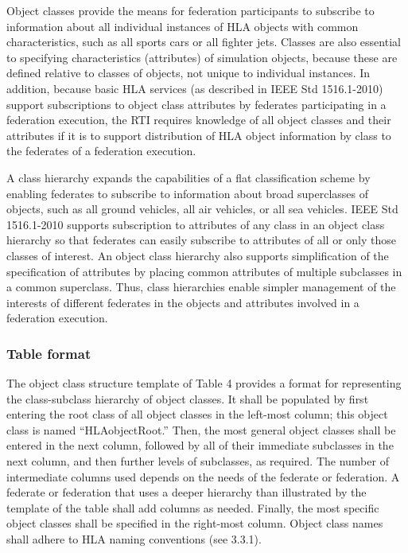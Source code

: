 
\newpage
Object classes provide the means for federation participants to subscribe to information about all individual instances of HLA objects with common characteristics, such as all sports cars or all fighter jets. Classes are also essential to specifying characteristics (attributes) of simulation objects, because these are defined relative to classes of objects, not unique to individual instances. In addition, because basic HLA services (as described in IEEE Std 1516.1-2010) support subscriptions to object class attributes by federates participating in a federation execution, the RTI requires knowledge of all object classes and their attributes if it is to support distribution of HLA object information by class to the federates of a federation execution.

A class hierarchy expands the capabilities of a flat classification scheme by enabling federates to subscribe to information about broad superclasses of objects, such as all ground vehicles, all air vehicles, or all sea vehicles. IEEE Std 1516.1-2010 supports subscription to attributes of any class in an object class hierarchy so that federates can easily subscribe to attributes of all or only those classes of interest. An object class hierarchy also supports simplification of the specification of attributes by placing common attributes of multiple subclasses in a common superclass. Thus, class hierarchies enable simpler management of the interests of different federates in the objects and attributes involved in a federation execution.

\subsubsection{Table format}
The object class structure template of Table 4 provides a format for representing the class-subclass hierarchy of object classes. It shall be populated by first entering the root class of all object classes in the left-most column; this object class is named ``HLAobjectRoot.'' Then, the most general object classes shall be entered in the next column, followed by all of their immediate subclasses in the next column, and then further levels of subclasses, as required. The number of intermediate columns used depends on the needs of the federate or federation. A federate or federation that uses a deeper hierarchy than illustrated by the template of the table shall add columns as needed. Finally, the most specific object classes shall be specified in the right-most column. Object class names shall adhere to HLA naming conventions (see 3.3.1).

